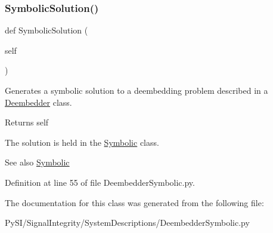 \subsubsection{\texorpdfstring{Symbolic\+Solution()}{SymbolicSolution()}}
{\footnotesize\ttfamily def Symbolic\+Solution (\begin{DoxyParamCaption}\item[{}]{self }\end{DoxyParamCaption})}



Generates a symbolic solution to a deembedding problem described in a \hyperlink{namespaceSignalIntegrity_1_1SystemDescriptions_1_1Deembedder}{Deembedder} class. 

\begin{DoxyReturn}{Returns}
self
\end{DoxyReturn}
The solution is held in the \hyperlink{namespaceSignalIntegrity_1_1SystemDescriptions_1_1Symbolic}{Symbolic} class.

\begin{DoxySeeAlso}{See also}
\hyperlink{namespaceSignalIntegrity_1_1SystemDescriptions_1_1Symbolic}{Symbolic} 
\end{DoxySeeAlso}


Definition at line 55 of file Deembedder\+Symbolic.\+py.



The documentation for this class was generated from the following file\+:\begin{DoxyCompactItemize}
\item 
Py\+S\+I/\+Signal\+Integrity/\+System\+Descriptions/Deembedder\+Symbolic.\+py\end{DoxyCompactItemize}
